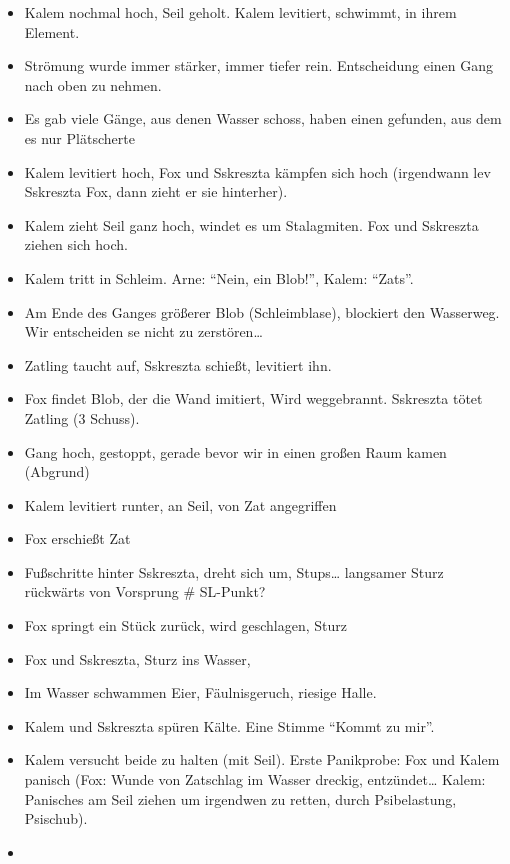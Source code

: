 \documentclass[11pt]{scrartcl}
\begin{document}
\begin{itemize}
  \begin{itemize}
  \item
    Kalem nochmal hoch, Seil geholt. Kalem levitiert, schwimmt, in ihrem
    Element.
  \item
    Strömung wurde immer stärker, immer tiefer rein. Entscheidung einen
    Gang nach oben zu nehmen.
  \item
    Es gab viele Gänge, aus denen Wasser schoss, haben einen gefunden,
    aus dem es nur Plätscherte
  \item
    Kalem levitiert hoch, Fox und Sskreszta kämpfen sich hoch
    (irgendwann lev Sskreszta Fox, dann zieht er sie hinterher).
  \item
    Kalem zieht Seil ganz hoch, windet es um Stalagmiten. Fox und
    Sskreszta ziehen sich hoch.
  \item
    Kalem tritt in Schleim. Arne: ``Nein, ein Blob!'', Kalem: ``Zats''.
  \item
    Am Ende des Ganges größerer Blob (Schleimblase), blockiert den
    Wasserweg. Wir entscheiden se nicht zu zerstören\ldots{}
  \item
    Zatling taucht auf, Sskreszta schießt, levitiert ihn.
  \item
    Fox findet Blob, der die Wand imitiert, Wird weggebrannt. Sskreszta
    tötet Zatling (3 Schuss).
  \item
    Gang hoch, gestoppt, gerade bevor wir in einen großen Raum kamen
    (Abgrund)
  \item
    Kalem levitiert runter, an Seil, von Zat angegriffen
  \item
    Fox erschießt Zat
  \item
    Fußschritte hinter Sskreszta, dreht sich um, Stups\ldots{} langsamer
    Sturz rückwärts von Vorsprung \# SL-Punkt?
  \item
    Fox springt ein Stück zurück, wird geschlagen, Sturz
  \item
    Fox und Sskreszta, Sturz ins Wasser,
  \item
    Im Wasser schwammen Eier, Fäulnisgeruch, riesige Halle.
  \item
    Kalem und Sskreszta spüren Kälte. Eine Stimme ``Kommt zu mir''.
  \item
    Kalem versucht beide zu halten (mit Seil). Erste Panikprobe: Fox und
    Kalem panisch (Fox: Wunde von Zatschlag im Wasser dreckig,
    entzündet\ldots{} Kalem: Panisches am Seil ziehen um irgendwen zu
    retten, durch Psibelastung, Psischub).
  \item

\end{itemize}
\end{itemize}
\end{document}
